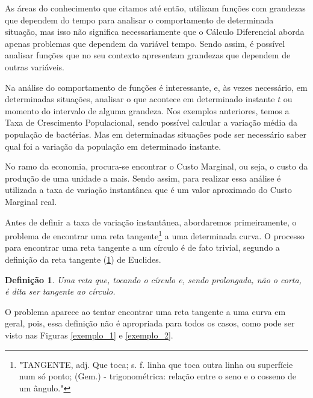 \documentclass[
	12pt,				%
	openright,			%
    twoside,			%
	a4paper,			%
	chapter=TITLE,		%
	english,			%
	french,				%
	spanish,			%
	brazil				%
	]{abntex2}
\newtheorem{definicao}{Definição}
\numberwithin{lema}{chapter}
\numberwithin{teorema}{chapter}
\numberwithin{definicao}{chapter}
\numberwithin{exemplo}{chapter}
\numberwithin{figure}{chapter}
\begin{document}
As áreas do conhecimento que citamos até então, utilizam funções com grandezas que dependem do tempo para analisar o comportamento de determinada situação, mas isso não significa necessariamente que o Cálculo Diferencial aborda apenas problemas que dependem da variável tempo. Sendo assim, é possível analisar funções que no seu contexto apresentam grandezas que dependem de outras variáveis.

Na análise do comportamento de funções é interessante, e, às vezes necessário, em determinadas situações, analisar o que acontece em determinado instante $t$ ou momento do intervalo de alguma grandeza. Nos exemplos anteriores, temos a Taxa de Crescimento Populacional, sendo possível calcular a variação média da população de bactérias. Mas em determinadas situações pode ser necessário saber qual foi a variação da população em determinado instante. 

No ramo da economia, procura-se encontrar o Custo Marginal, ou seja, o custo da produção de uma unidade a mais. Sendo assim, para realizar essa análise é utilizada a taxa de variação instantânea que é um valor aproximado do Custo Marginal real.

Antes de definir a taxa de variação instantânea, abordaremos primeiramente, o problema de encontrar uma reta tangente\footnote{"TANGENTE, adj. Que toca; s. f. linha que toca outra linha ou superfície num só ponto; (Gem.) - trigonométrica: relação entre o seno e o cosseno de um ângulo."\cite[p. 742]{dicionario}} a uma determinada curva. O processo para encontrar uma reta tangente a um círculo é de fato trivial, segundo a definição da reta tangente (\ref{tangente}) de Euclides.

\begin{definicao}
	\label{tangente}
	\cite{euclides} Uma reta que, tocando o círculo e, sendo prolongada, não o corta, é
	dita ser tangente ao círculo.
\end{definicao}

O problema aparece ao tentar encontrar uma reta tangente a uma curva em geral, pois, essa definição não é apropriada para todos os casos, como pode ser visto nas Figuras \ref{exemplo_1} e \ref{exemplo_2}.
\end{document}
